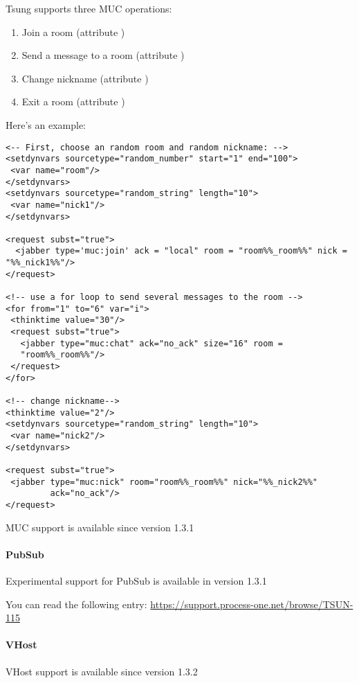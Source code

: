 \documentclass{TSUNG-en}
\begin{document}
Tsung supports three MUC operations:
\begin{enumerate}
\item Join a room (attribute )
\item Send a message to a room (attribute )
\item Change nickname (attribute )
\item Exit a room (attribute )
\end{enumerate}

Here's an example:
\begin{Verbatim}
<-- First, choose an random room and random nickname: -->
<setdynvars sourcetype="random_number" start="1" end="100">
 <var name="room"/>
</setdynvars>
<setdynvars sourcetype="random_string" length="10">
 <var name="nick1"/>
</setdynvars>

<request subst="true">
  <jabber type='muc:join' ack = "local" room = "room%%_room%%" nick = "%%_nick1%%"/>
</request>

<!-- use a for loop to send several messages to the room -->
<for from="1" to="6" var="i">
 <thinktime value="30"/>
 <request subst="true">
   <jabber type="muc:chat" ack="no_ack" size="16" room =
   "room%%_room%%"/>
 </request>
</for>

<!-- change nickname-->
<thinktime value="2"/>
<setdynvars sourcetype="random_string" length="10">
 <var name="nick2"/>
</setdynvars>

<request subst="true">
 <jabber type="muc:nick" room="room%%_room%%" nick="%%_nick2%%"
         ack="no_ack"/>
</request>
\end{Verbatim}

MUC support is available since version 1.3.1

\paragraph{PubSub}

Experimental support for PubSub is available in version 1.3.1

You can read the following entry: \url{https://support.process-one.net/browse/TSUN-115}

\paragraph{VHost}

VHost support is available since version 1.3.2
\end{document}
